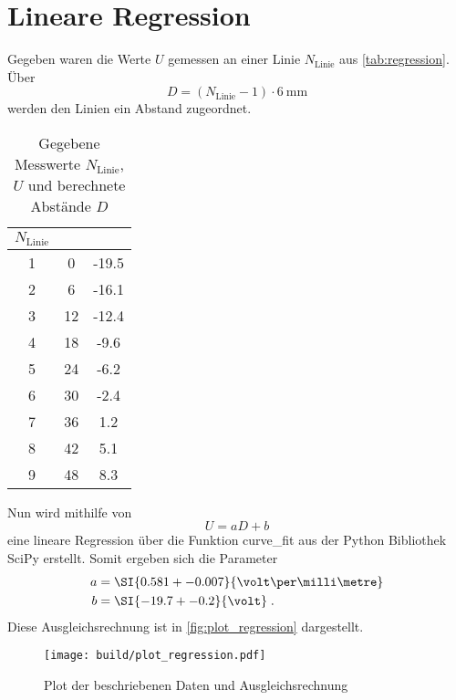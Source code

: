 \section{Lineare Regression}
\label{sec:Regression}

Gegeben waren die Werte $U$ gemessen an einer Linie $N_\text{Linie}$ aus \autoref{tab:regression}. 
Über 
\begin{equation}
    D = (N_\text{Linie}-1) \cdot \SI{6}{\milli\metre}
\end{equation}
werden den Linien ein Abstand zugeordnet.

\begin{table}
    \centering
    \begin{tabular}{S S S}
        \toprule
        {$N_\text{Linie}$} &  &  \\
         & 0 & -19.5 \\
        2 & 6 & -16.1 \\
        3 & 12 & -12.4 \\
        4 & 18 & -9.6 \\
        5 & 24 & -6.2 \\
        6 & 30 & -2.4 \\
        7 & 36 & 1.2 \\
        8 & 42 & 5.1 \\
        9 & 48 & 8.3 \\
        \bottomrule
    \end{tabular}
    \caption{Gegebene Messwerte $N_\text{Linie}$, $U$ und berechnete Abstände $D$}
    \label{tab:regression}
\end{table}

Nun wird mithilfe von
\begin{equation}
    U = a D + b
\end{equation}
eine lineare Regression über die Funktion curve\_fit aus der Python Bibliothek SciPy erstellt.
Somit ergeben sich die Parameter
\begin{align}
    a &= \SI{0.581+-0.007}{\volt\per\milli\metre} \\
    b &= \SI{-19.7+-0.2}{\volt} \; .
\end{align}
Diese Ausgleichsrechnung ist in \autoref{fig:plot_regression} dargestellt.

\begin{figure}[]
    \centering
    \texttt{[image: build/plot\_regression.pdf]}
    \caption{Plot der beschriebenen Daten und Ausgleichsrechnung}
    \label{fig:plot_regression}
\end{figure}
